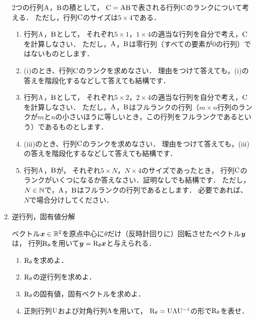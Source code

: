 \begin{enumerate}[label=問\arabic*.]
  \vspace{1mm}
  2つの行列$\mathrm{A}$，$\mathrm{B}$の積として，
  $\mathrm{C}=\mathrm{A}\mathrm{B}$で表される行列$\mathrm{C}$のランクについて考える．
  ただし，行列$\mathrm{C}$のサイズは$5\times 4$である．

  \begin{enumerate}[label=(\roman*)]
    \item 行列$\mathrm{A}$，$\mathrm{B}$として，
      それぞれ$5\times 1$，$1\times 4$の適当な行列を自分で考え，$\mathrm{C}$を計算しなさい．
      ただし，$\mathrm{A}$，$\mathrm{B}$は零行列（すべての要素が0の行列）ではないものとします．
    \item (i)のとき、行列$\mathrm{C}$のランクを求めなさい．
      理由をつけて答えても，(i)の答えを階段化するなどして答えても結構です．
    \item 行列$\mathrm{A}$，$\mathrm{B}$として，
      それぞれ$5\times 2$，$2\times 4$の適当な行列を自分で考え，$\mathrm{C}$を計算しなさい．
      ただし，$\mathrm{A}$，$\mathrm{B}$はフルランクの行列（$m\times n$行列のランクが$m$と$n$の小さいほうに等しいとき，この行列をフルランクであるという）であるものとします．
    \item (iii)のとき、行列$\mathrm{C}$のランクを求めなさい．
      理由をつけて答えても，(iii)の答えを階段化するなどして答えても結構です．
    \item 行列$\mathrm{A}$，$\mathrm{B}$が，
      それぞれ$5\times N$，$N\times 4$のサイズであったとき，
      行列$\mathrm{C}$のランクがいくつになるか答えなさい．証明なしでも結構です．
      ただし，$N\in \mathbb{N}$で，$\mathrm{A}$，$\mathrm{B}$はフルランクの行列であるとします．
      必要であれば、$N$で場合分けしてください．
  \end{enumerate}
  \item 逆行列，固有値分解

  \vspace{1mm}
  ベクトル$\boldsymbol{x} \in \mathbb{R}^2$を原点中心に$\theta$だけ（反時計回りに）回転させたベクトル$\boldsymbol{y}$は，
  行列$\mathrm{R}_\theta$を用いて$\boldsymbol{y} = \mathrm{R}_\theta \boldsymbol{x}$と与えられる．
  \begin{enumerate}[label=(\roman*)]
    \item $\mathrm{R}_\theta$を求めよ．
    \item $\mathrm{R}_\theta$の逆行列を求めよ．
    \item $\mathrm{R}_\theta$の固有値，固有ベクトルを求めよ．
    \item 正則行列$\mathrm{U}$および対角行列$\mathrm{\Lambda}$を用いて，
      $\mathrm{R}_\theta = \mathrm{U}\mathrm{\Lambda} \mathrm{U}^{-1}$の形で$\mathrm{R}_\theta$を表せ．
  \end{enumerate}


\end{enumerate}
